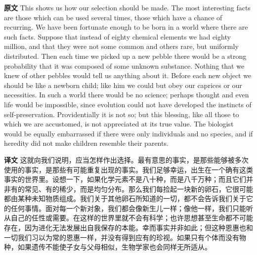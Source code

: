 \documentclass[UTF8,zihao=-4]{ctexart}
\newcommand{\BodyFont}{\fontsize{10.5pt}{15.5pt}\selectfont}
\newcommand{\origlabel}{\textbf{原文}\quad}
\newcommand{\translabel}{\textbf{译文}\quad}
\newenvironment{enblock}{\par\noindent\begingroup\BodyFont\origlabel}{\par\endgroup}
\newenvironment{zhblock}{\par\noindent\begingroup\BodyFont\translabel}{\par\endgroup\vspace{0.35em}}
\begin{document}
\begin{enblock}
This shows us how our selection should be made. The most interesting facts are those which can be used several times, those which have a chance of recurring. We have been fortunate enough to be born in a world where there are such facts. Suppose that instead of eighty chemical elements we had eighty million, and that they were not some common and others rare, but uniformly distributed. Then each time we picked up a new pebble there would be a strong probability that it was composed of some unknown substance. Nothing that we knew of other pebbles would tell us anything about it. Before each new object we should be like a newborn child; like him we could but obey our caprices or our necessities. In such a world there would be no science; perhaps thought and even life would be impossible, since evolution could not have developed the instincts of self-preservation. Providentially it is not so; but this blessing, like all those to which we are accustomed, is not appreciated at its true value. The biologist would be equally embarrassed if there were only individuals and no species, and if heredity did not make children resemble their parents.
\end{enblock}
\begin{zhblock}
这就向我们说明，应当怎样作出选择。最有意思的事实，是那些能够被多次使用的事实，是那些有可能重复出现的事实。我们足够幸运，出生在一个确有这类事实的世界里。设想一下，如果化学元素不是八十种，而是八千万种；而且它们并非有的常见、有的稀少，而是均匀分布。那么我们每捡起一块新的卵石，它很可能都由某种未知物质组成。我们关于其他卵石所知道的一切，都不会告诉我们关于它的任何事情。面对每一个新对象，我们都会像新生儿一样；像他一样，我们只能听从自己的任性或需要。在这样的世界里就不会有科学；也许思想甚至生命都不可能存在，因为进化无法发展出自我保存的本能。幸而事实并非如此；但这种恩惠也和一切我们习以为常的恩惠一样，并没有得到应有的珍视。如果只有个体而没有物种，如果遗传不能使子女与父母相似，生物学家也会同样无所适从。\end{zhblock}
\end{document}
